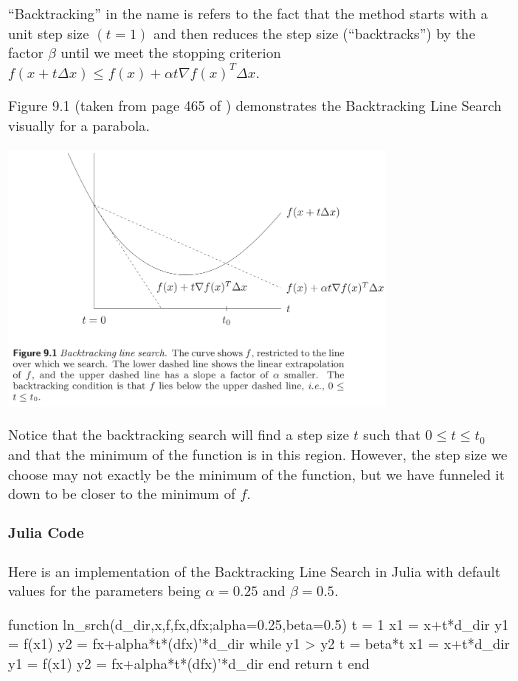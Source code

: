 \documentclass[11pt]{article}
\begin{document}
``Backtracking'' in the name is refers to the fact that the method starts with a unit step size $(t=1)$ and then reduces the step size (``backtracks'') by the factor $\beta$ until we meet the stopping criterion $f(x+t\Delta x)\leq f(x)+\alpha t\nabla f(x)^T\Delta x$.

Figure 9.1 (taken from page 465 of \cite{Boyd2004}) demonstrates the Backtracking Line Search visually for a parabola.
\begin{center}
	\includegraphics[width=0.75\textwidth]{backtracking_line_search_diagram.png}
\end{center}

Notice that the backtracking search will find a step size $t$ such that $0\leq t\leq t_0$ and that the minimum of the function is in this region. However, the step size we choose may not exactly be the minimum of the function, but we have funneled it down to be closer to the minimum of $f$.
\paragraph{Julia Code}
Here is an implementation of the Backtracking Line Search in Julia with default values for the parameters being $\alpha=0.25$ and $\beta=0.5$.
\begin{jllisting}
	function ln_srch(d_dir,x,f,fx,dfx;alpha=0.25,beta=0.5)
		t = 1
		x1 = x+t*d_dir
		y1 = f(x1)
		y2 = fx+alpha*t*(dfx)'*d_dir
		while y1 > y2
			t = beta*t
			x1 = x+t*d_dir
			y1 = f(x1)
			y2 = fx+alpha*t*(dfx)'*d_dir
		end
		return t
	end
\end{jllisting}
\end{document}
